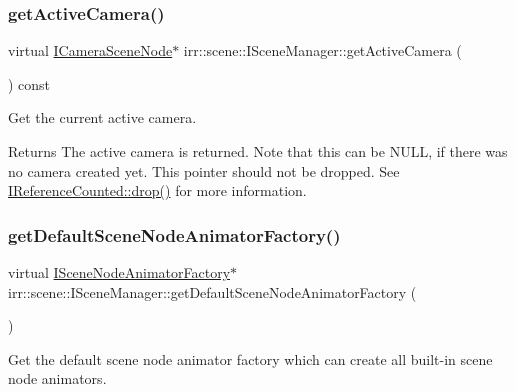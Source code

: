 \subsubsection{\texorpdfstring{get\+Active\+Camera()}{getActiveCamera()}}
{\footnotesize\ttfamily virtual \hyperlink{classirr_1_1scene_1_1ICameraSceneNode}{I\+Camera\+Scene\+Node}$\ast$ irr\+::scene\+::\+I\+Scene\+Manager\+::get\+Active\+Camera (\begin{DoxyParamCaption}{ }\end{DoxyParamCaption}) const\hspace{0.3cm}{\ttfamily [pure virtual]}}



Get the current active camera. 

\begin{DoxyReturn}{Returns}
The active camera is returned. Note that this can be N\+U\+LL, if there was no camera created yet. This pointer should not be dropped. See \hyperlink{classirr_1_1IReferenceCounted_a03856a09355b89d178090c4a5f738543}{I\+Reference\+Counted\+::drop()} for more information. 
\end{DoxyReturn}
\mbox{\label{classirr_1_1scene_1_1ISceneManager_adeb3d24c8ffafd5e671f344931a0b3a5}} 
\subsubsection{\texorpdfstring{get\+Default\+Scene\+Node\+Animator\+Factory()}{getDefaultSceneNodeAnimatorFactory()}}
{\footnotesize\ttfamily virtual \hyperlink{classirr_1_1scene_1_1ISceneNodeAnimatorFactory}{I\+Scene\+Node\+Animator\+Factory}$\ast$ irr\+::scene\+::\+I\+Scene\+Manager\+::get\+Default\+Scene\+Node\+Animator\+Factory (\begin{DoxyParamCaption}{ }\end{DoxyParamCaption})\hspace{0.3cm}{\ttfamily [pure virtual]}}



Get the default scene node animator factory which can create all built-\/in scene node animators. 

